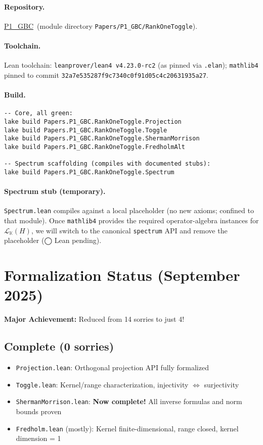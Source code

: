 \documentclass[11pt]{article}
\theoremstyle{definition}
\newcommand{\K}{\mathbb{K}}
\newcommand{\CL}[2]{\mathcal{L}_{#1}(#2)} %
\newcommand{\leanRepoTag}{\href{https://github.com/AICardiologist/FoundationRelativity/tree/main/Papers/P1_GBC}{P1\_GBC}}
\newcommand{\leanpending}{\textsf{\small \textcolor{orange!80!black}{◯ Lean pending}}}
\begin{document}
\paragraph{Repository.} \leanRepoTag\ (module directory \texttt{Papers/P1\_GBC/RankOneToggle}).

\paragraph{Toolchain.} Lean toolchain: \texttt{leanprover/lean4 v4.23.0-rc2} (as pinned via \texttt{.elan}); \texttt{mathlib4} pinned to commit \texttt{32a7e535287f9c7340c0f91d05c4c20631935a27}.

\paragraph{Build.}
\begin{verbatim}
-- Core, all green:
lake build Papers.P1_GBC.RankOneToggle.Projection
lake build Papers.P1_GBC.RankOneToggle.Toggle
lake build Papers.P1_GBC.RankOneToggle.ShermanMorrison
lake build Papers.P1_GBC.RankOneToggle.FredholmAlt

-- Spectrum scaffolding (compiles with documented stubs):
lake build Papers.P1_GBC.RankOneToggle.Spectrum
\end{verbatim}

\paragraph{Spectrum stub (temporary).}
\texttt{Spectrum.lean} compiles against a local placeholder (no new axioms; confined to that module). Once \texttt{mathlib4} provides the required operator-algebra instances for $\CL{\K}{H}$, we will switch to the canonical \texttt{spectrum} API and remove the placeholder (\leanpending).

\section{Formalization Status (September 2025)}

\textbf{Major Achievement:} Reduced from 14 sorries to just 4!

\subsection{Complete (0 sorries)}
\begin{itemize}
\item \texttt{Projection.lean}: Orthogonal projection API fully formalized
\item \texttt{Toggle.lean}: Kernel/range characterization, injectivity $\Leftrightarrow$ surjectivity
\item \texttt{ShermanMorrison.lean}: \textbf{Now complete!} All inverse formulas and norm bounds proven
\item \texttt{Fredholm.lean} (mostly): Kernel finite-dimensional, range closed, kernel dimension = 1
\end{itemize}
\end{document}
